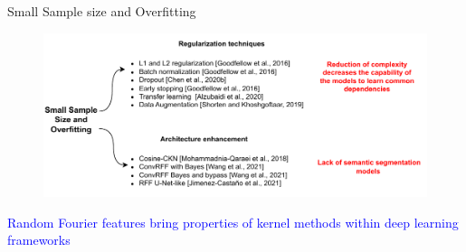 \documentclass[aspectratio=169]{beamer}
\begin{document}
\begin{frame}{Small Sample size and
Overfitting}

\begin{figure}
    \centering
    \includegraphics[width=0.8\linewidth]{Figures/State-of-the-arr-obj1.pdf}
\end{figure}   

\begin{center}
    \textcolor{blue}{Random Fourier features bring properties of kernel methods within deep learning frameworks}    
\end{center}


\end{frame}
\end{document}
